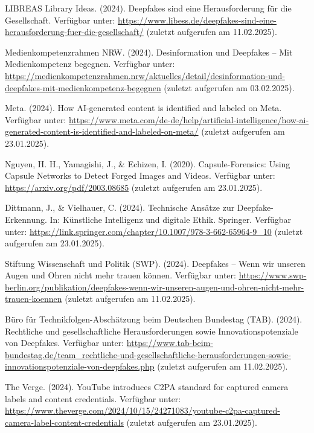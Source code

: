 \documentclass[a4paper,12pt]{article}
\begin{document}
\begin{thebibliography}{99}
 LIBREAS Library Ideas. (2024). Deepfakes sind eine Herausforderung für die Gesellschaft.
Verfügbar unter: \url{https://www.libess.de/deepfakes-sind-eine-herausforderung-fuer-die-gesellschaft/} (zuletzt aufgerufen am 11.02.2025).

 Medienkompetenzrahmen NRW. (2024). Desinformation und Deepfakes – Mit Medienkompetenz begegnen. 
Verfügbar unter: \url{https://medienkompetenzrahmen.nrw/aktuelles/detail/desinformation-und-deepfakes-mit-medienkompetenz-begegnen} (zuletzt aufgerufen am 03.02.2025).

 Meta. (2024). How AI-generated content is identified and labeled on Meta. 
Verfügbar unter: \url{https://www.meta.com/de-de/help/artificial-intelligence/how-ai-generated-content-is-identified-and-labeled-on-meta/} (zuletzt aufgerufen am 23.01.2025).

 Nguyen, H. H., Yamagishi, J., \& Echizen, I. (2020). Capsule-Forensics: Using Capsule Networks to Detect Forged Images and Videos.
Verfügbar unter: \url{https://arxiv.org/pdf/2003.08685} (zuletzt aufgerufen am 23.01.2025).

 Dittmann, J., \& Vielhauer, C. (2024). Technische Ansätze zur Deepfake-Erkennung. In: Künstliche Intelligenz und digitale Ethik. Springer. 
Verfügbar unter: \url{https://link.springer.com/chapter/10.1007/978-3-662-65964-9_10} (zuletzt aufgerufen am 23.01.2025).

 Stiftung Wissenschaft und Politik (SWP). (2024). Deepfakes – Wenn wir unseren Augen und Ohren nicht mehr trauen können.  
Verfügbar unter: \url{https://www.swp-berlin.org/publikation/deepfakes-wenn-wir-unseren-augen-und-ohren-nicht-mehr-trauen-koennen} (zuletzt aufgerufen am 11.02.2025).

 Büro für Technikfolgen-Abschätzung beim Deutschen Bundestag (TAB). (2024). Rechtliche und gesellschaftliche Herausforderungen sowie Innovationspotenziale von Deepfakes.
Verfügbar unter: \url{https://www.tab-beim-bundestag.de/team_rechtliche-und-gesellschaftliche-herausforderungen-sowie-innovationspotenziale-von-deepfakes.php} (zuletzt aufgerufen am 11.02.2025).

 The Verge. (2024). YouTube introduces C2PA standard for captured camera labels and content credentials. 
Verfügbar unter: \url{https://www.theverge.com/2024/10/15/24271083/youtube-c2pa-captured-camera-label-content-credentials} (zuletzt aufgerufen am 23.01.2025).


\end{thebibliography}
\end{document}
